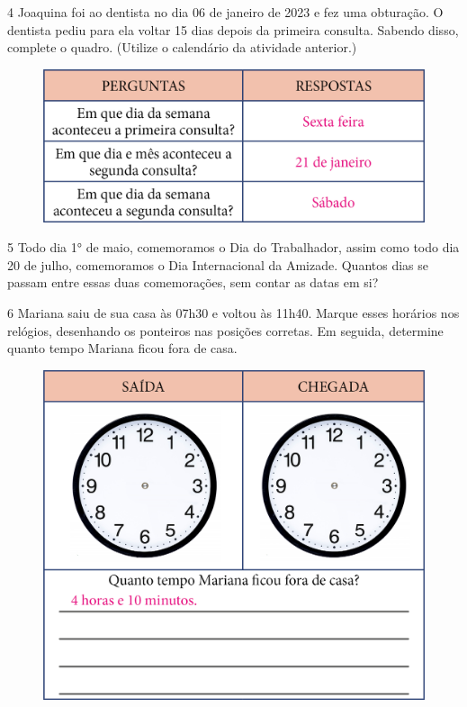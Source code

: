 \num{4} Joaquina foi ao dentista no dia 06 de janeiro de 2023 e fez uma
obturação. O dentista pediu para ela voltar 15 dias depois da primeira
consulta. Sabendo disso, complete o quadro. (Utilize o calendário
da atividade anterior.)

\begin{figure}[htpb!]
\includegraphics[width=\textwidth]{./media/image53.png}
\end{figure}

\pagebreak
\num{5} Todo dia 1° de maio, comemoramos o Dia do Trabalhador,
assim como todo dia 20 de julho, comemoramos o
Dia Internacional da Amizade. Quantos dias se passam entre essas duas
comemorações, sem contar as datas em si?


\num{6} Mariana saiu de sua casa às 07h30 e voltou às 11h40. Marque esses
horários nos relógios, desenhando os ponteiros nas posições
corretas. Em seguida, determine quanto tempo Mariana ficou fora de casa.


\begin{figure}[htpb!]
\centering
\includegraphics[width=.65\textwidth]{./media/image54.png}
\end{figure}

